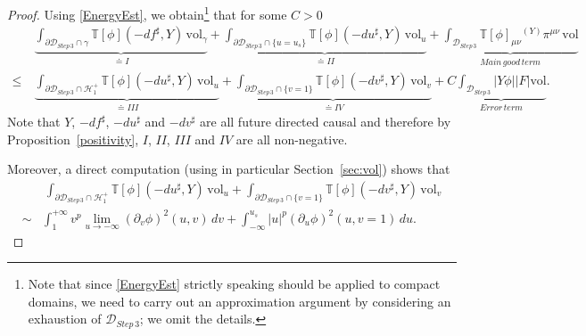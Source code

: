 \documentclass[10pt, reqno]{amsart}
\theoremstyle{definition}
\theoremstyle{remark}
\numberwithin{equation}{section}
\newcommand{\rd}{\partial}
\newcommand{\0}{\emptyset}
\newcommand{\calH}{\mathcal H}
\newcommand{\EH}{\calH^{+}}
\newcommand{\vol}{\mathrm{vol}}
\begin{document}
\begin{proof}
Using \eqref{EnergyEst}, we obtain\footnote{Note that since \eqref{EnergyEst} strictly speaking should be applied to compact domains, we need to carry out an approximation argument by considering an exhaustion of $\mathcal D_{Step\,3}$; we omit the details.} that for some $C>0$
\begin{equation}\label{eq:main.est.before.gamma}
\begin{split}
&\:\underbrace{\int_{\rd\mathcal D_{Step\,3}\cap\gamma} \mathbb T[\phi](-df^\sharp, Y)\,\vol_{\gamma}}_{\doteq I}+ \underbrace{\int_{\rd\mathcal D_{Step\,3}\cap \{u=u_s\}} \mathbb T[\phi](-du^\sharp, Y)\,\vol_{u}}_{\doteq II}+\underbrace{\int_{\mathcal D_{Step\,3}} \mathbb T[\phi]_{\mu\nu}{ }^{(Y)}\pi^{\mu\nu} \, \vol}_{Main\,good\,term}\\
\leq &\:\underbrace{\int_{\rd\mathcal D_{Step\,3}\cap \EH_1} \mathbb T[\phi](-du^\sharp, Y)\,\vol_{u}}_{\doteq III} + \underbrace{\int_{\rd\mathcal D_{Step\,3}\cap \{v=1\}} \mathbb T[\phi](-dv^\sharp, Y)\,\vol_{v}}_{\doteq IV} + C\underbrace{\int_{\mathcal D_{Step\,3}} |Y\phi| |F| \vol}_{Error\,term}.
\end{split}
\end{equation}
Note that $Y$, $-df^\sharp$, $-du^\sharp$ and $-dv^\sharp$ are all future directed causal and therefore by Proposition~\ref{positivity}, $I$, $II$, $III$ and $IV$ are all non-negative.

Moreover, a direct computation (using in particular Section~\ref{sec:vol}) shows that
\begin{equation}\label{past.of.gamma.data}
\begin{split}
&\:\int_{\rd\mathcal D_{Step\,3}\cap \EH_1} \mathbb T[\phi](-du^\sharp, Y)\,\vol_{u}  + \int_{\rd\mathcal D_{Step\,3}\cap \{v=1\}} \mathbb T[\phi](-dv^\sharp, Y)\,\vol_{v}\\
\sim & \int_1^{+\infty} v^p \lim_{u\to -\infty} (\rd_v\phi)^2(u,v)\, dv  + \int_{-\infty}^{u_s} |u|^p(\rd_u\phi)^2(u,v=1)\, du.
\end{split}
\end{equation}



\end{proof}
\end{document}
